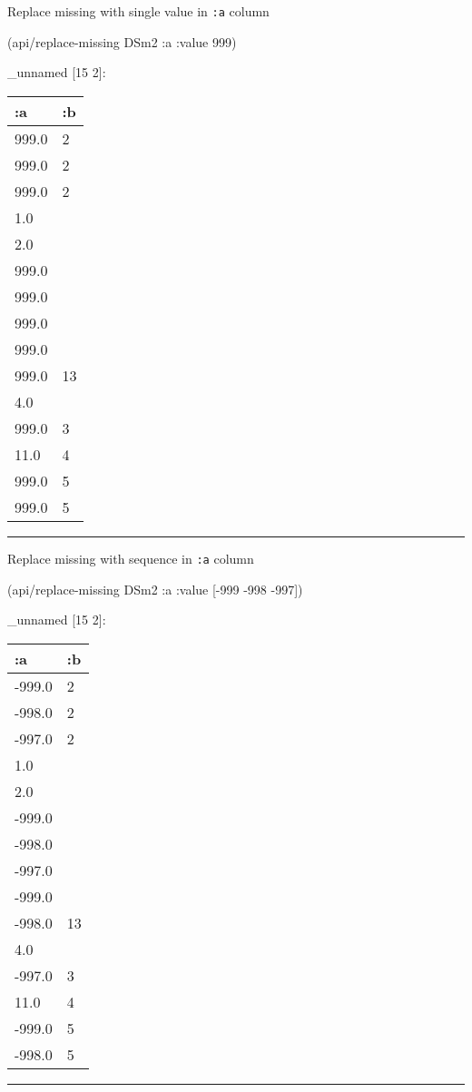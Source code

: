 \documentclass[]{article}
\newenvironment{Shaded}{\begin{snugshade}}{\end{snugshade}}
\newcommand{\AttributeTok}[1]{\textcolor[rgb]{0.77,0.63,0.00}{#1}}
\newcommand{\DecValTok}[1]{\textcolor[rgb]{0.00,0.00,0.81}{#1}}
\newcommand{\NormalTok}[1]{#1}
\begin{document}
Replace missing with single value in \texttt{:a} column

\begin{Shaded}
\begin{Highlighting}[]
\NormalTok{(api/replace-missing DSm2 }\AttributeTok{:a} \AttributeTok{:value} \DecValTok{999}\NormalTok{)}
\end{Highlighting}
\end{Shaded}

\_unnamed {[}15 2{]}:

\begin{longtable}[]{@{}ll@{}}
\toprule
:a & :b\tabularnewline
\midrule
\endhead
999.0 & 2\tabularnewline
999.0 & 2\tabularnewline
999.0 & 2\tabularnewline
1.0 &\tabularnewline
2.0 &\tabularnewline
999.0 &\tabularnewline
999.0 &\tabularnewline
999.0 &\tabularnewline
999.0 &\tabularnewline
999.0 & 13\tabularnewline
4.0 &\tabularnewline
999.0 & 3\tabularnewline
11.0 & 4\tabularnewline
999.0 & 5\tabularnewline
999.0 & 5\tabularnewline
\bottomrule
\end{longtable}

\begin{center}\rule{0.5\linewidth}{0.5pt}\end{center}

Replace missing with sequence in \texttt{:a} column

\begin{Shaded}
\begin{Highlighting}[]
\NormalTok{(api/replace-missing DSm2 }\AttributeTok{:a} \AttributeTok{:value}\NormalTok{ [-}\DecValTok{999} \DecValTok{-998} \DecValTok{-997}\NormalTok{])}
\end{Highlighting}
\end{Shaded}

\_unnamed {[}15 2{]}:

\begin{longtable}[]{@{}ll@{}}
\toprule
:a & :b\tabularnewline
\midrule
\endhead
-999.0 & 2\tabularnewline
-998.0 & 2\tabularnewline
-997.0 & 2\tabularnewline
1.0 &\tabularnewline
2.0 &\tabularnewline
-999.0 &\tabularnewline
-998.0 &\tabularnewline
-997.0 &\tabularnewline
-999.0 &\tabularnewline
-998.0 & 13\tabularnewline
4.0 &\tabularnewline
-997.0 & 3\tabularnewline
11.0 & 4\tabularnewline
-999.0 & 5\tabularnewline
-998.0 & 5\tabularnewline
\bottomrule
\end{longtable}

\begin{center}\rule{0.5\linewidth}{0.5pt}\end{center}
\end{document}
